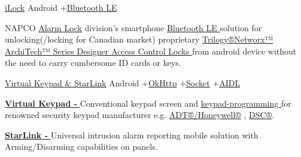 \begin{projectentries}
    \projectentry 
    {\href{https://play.google.com/store/apps/details?id=com.napcosecurity.android.ilock&hl=en}{iLock}}
    {Android
    +{\href{https://developer.android.com/guide/components/aidl}{Bluetooth LE}}}
    {
      \begin{projectitems} %
        \item {NAPCO 
        {\href{http://www.alarmlock.com}{Alarm Lock}}
        division's smartphone 
        {\href{https://developer.android.com/guide/components/aidl}{Bluetooth LE }}
        solution for unlocking(/locking for Canadian market) proprietary 
        {\href{http://www.alarmlock.com}{Trilogy®Networx™ ArchiTech™ Series Designer Access Control Locks }} 
        from android device without the need to carry cumbersome ID cards or keys.}
      \end{projectitems}
    }
    
    \projectentry 
    {\href{https://www.youtube.com/watch?v=_UDmZebYkEY}{Virtual Keypad \& StarLink} }
    {Android
    +{\href{http://square.github.io/okhttp/}{OkHttp}}
    +{\href{https://www.geeksforgeeks.org/socket-programming-in-java/}{Socket}}
    +{\href{https://developer.android.com/guide/components/aidl}{AIDL}}}
    {
      \begin{projectitems} %
        \item {\href{https://youtu.be/_UDmZebYkEY?t=24}{\textbf{Virtual Keypad - }}
        Conventional keypad screen and 
        {\href{https://www.youtube.com/watch?v=Y1s-n1bF5G4}{keypad-programming }}
        for renowned security keypad manufacturer e.g. 
        {\href{https://www.security.honeywell.com/product-repository/6160v}{ADT®/Honeywell®}}
        , {\href{http://www.dsc.com/index.php?n=products&o=view&id=60}{DSC®}}.}
        \item {\href{https://youtu.be/_UDmZebYkEY?t=70}{\textbf{StarLink - }}
        Universal intrusion alarm reporting mobile solution with Arming/Disarming capabilities on panels.}
      \end{projectitems}
    }


\end{projectentries}
